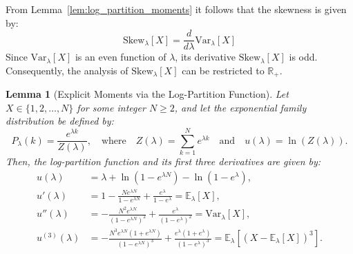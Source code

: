 \documentclass[a4paper, 10pt]{article}
\newcommand{\beq}{\begin{equation}}
\newcommand{\eeq}{\end{equation}}
\newtheorem{lemma}{Lemma}[section]
\theoremstyle{definition}
\begin{document}
From  Lemma~\ref{lem:log_partition_moments} it follows that the skewness is given by: \beq \text{Skew}_{\lambda}[X] = \frac{d}{d\lambda}\text{Var}_{\lambda}[X]\eeq Since $\text{Var}_{\lambda}[X]$ is an even function of $\lambda$, its derivative $\text{Skew}_{\lambda}[X]$ is odd. Consequently, the analysis of $\text{Skew}_{\lambda}[X]$ can be restricted to $\mathbb{R}_+$.\\
\begin{lemma}[Explicit Moments via the Log-Partition Function]\label{lem:explicit_moments}
Let \( X \in \{1, 2, \dots, N\} \) for some integer \( N \geq 2 \), and let the exponential family distribution be defined by:
\[
P_{\lambda}(k) = \frac{e^{\lambda k}}{Z(\lambda)}, \quad \text{where} \quad Z(\lambda) = \sum_{k=1}^N e^{\lambda k} \quad \text{and} \quad u(\lambda) = \ln(Z(\lambda)).
\]
Then, the log-partition function and its first three derivatives are given by:
\begin{align*}
u(\lambda) &= \lambda + \ln(1 - e^{\lambda N}) - \ln(1 - e^{\lambda}), \\
u'(\lambda) &= 1 - \frac{N e^{\lambda N}}{1 - e^{\lambda N}} + \frac{e^{\lambda}}{1 - e^{\lambda}} = \mathbb{E}_{\lambda}[X], \\
u''(\lambda) &= -\frac{N^2 e^{\lambda N}}{(1 - e^{\lambda N})^2} + \frac{e^{\lambda}}{(1 - e^{\lambda})^2} = \text{Var}_{\lambda}[X], \\
u^{(3)}(\lambda) &= -\frac{N^3 e^{\lambda N}(1 + e^{\lambda N})}{(1 - e^{\lambda N})^3} + \frac{e^{\lambda}(1 + e^{\lambda})}{(1 - e^{\lambda})^3} = \mathbb{E}_{\lambda}[(X - \mathbb{E}_{\lambda}[X])^3].
\end{align*}
\end{lemma}
\end{document}

